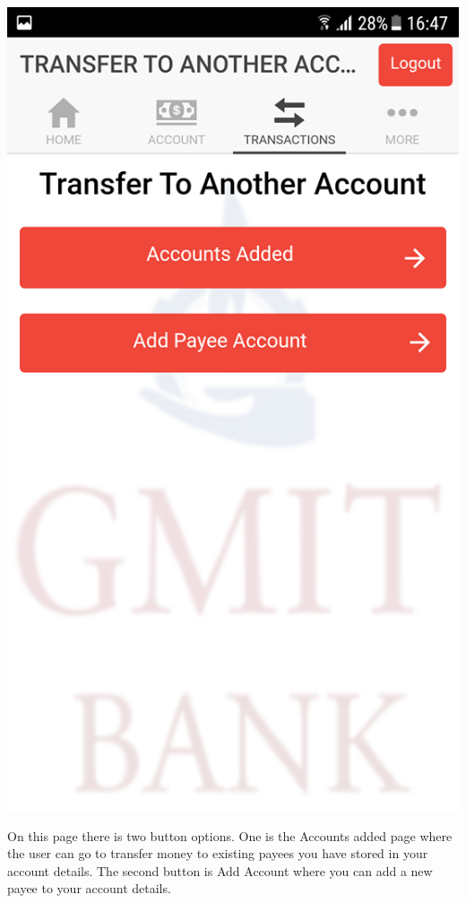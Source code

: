 \begin{center}
    \includegraphics[scale=0.5]{img/10transferspage.png}
\end{center}
On this page there is two button options. One is the Accounts added page where the user can go to transfer money to existing payees you have stored in your account details. The second button is Add Account where you can add a new payee to your account details.
\paragraph{}

